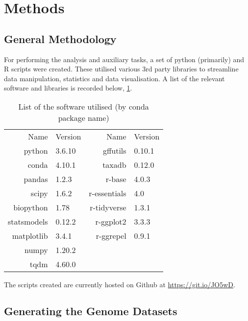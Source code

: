 \documentclass[../main.tex]{subfile}
\begin{document}
 \section{Methods}
    \subsection{General Methodology}
        For performing the analysis and auxiliary tasks, a set of python (primarily) and R scripts were created. These utilised various 3rd party libraries to streamline data manipulation, statistics and data visualisation. A list of the relevant software and libraries is recorded below, \cref{table:method/software}.

        \begin{table}[H]
            \centering
            \caption{List of the software utilised (by conda package name)}
            \begin{tabular}{@{} *{2}{r l}}
                \toprule
                Name           & Version & Name           & Version \\
                \cmidrule{1-2}             \cmidrule(l){3-4}
                python         & 3.6.10  & gffutils       & 0.10.1  \\
                conda          & 4.10.1  & taxadb         & 0.12.0  \\
                pandas         & 1.2.3   & r-base         & 4.0.3   \\
                scipy          & 1.6.2   & r-essentials   & 4.0     \\
                biopython      & 1.78    & r-tidyverse    & 1.3.1   \\
                statsmodels    & 0.12.2  & r-ggplot2      & 3.3.3   \\
                matplotlib     & 3.4.1   & r-ggrepel      & 0.9.1   \\
                numpy          & 1.20.2  & & \\
                tqdm           & 4.60.0  & & \\
                \bottomrule
            \end{tabular}
            \label{table:method/software}
        \end{table}

        The scripts created are currently hosted on Github at \href{https://git.io/JO5wD}{https://git.io/JO5wD}.
    \subsection{Generating the Genome Datasets}
\end{document}

